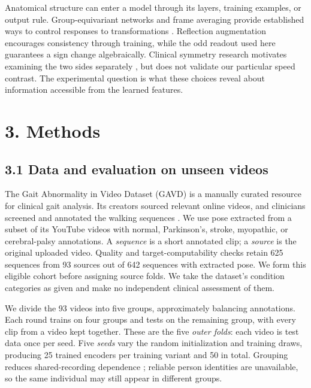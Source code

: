 \documentclass{article}
\begin{document}
Anatomical structure can enter a model through its layers, training
examples, or output rule. Group-equivariant networks and frame averaging
provide established ways to control responses to transformations
\citep{cohen2016gcnn, puny2022frame}. Reflection augmentation encourages
consistency through training, while the odd readout used here guarantees
a sign change algebraically. Clinical symmetry research motivates
examining the two sides separately \citep{patterson2010symmetry}, but
does not validate our particular speed contrast. The experimental
question is what these choices reveal about information accessible from
the learned features.

\section{3. Methods}\label{methods}

\subsection{3.1 Data and evaluation on unseen
videos}\label{data-and-evaluation-on-unseen-videos}

The Gait Abnormality in Video Dataset (GAVD) is a manually curated
resource for clinical gait analysis. Its creators sourced relevant
online videos, and clinicians screened and annotated the walking
sequences \citep{ranjan2025gavd}. We use pose extracted from a subset of
its YouTube videos with normal, Parkinson's, stroke, myopathic, or
cerebral-palsy annotations. A \emph{sequence} is a short annotated clip;
a \emph{source} is the original uploaded video. Quality and
target-computability checks retain 625 sequences from 93 sources out of
642 sequences with extracted pose. We form this eligible cohort before
assigning source folds. We take the dataset's condition categories as
given and make no independent clinical assessment of them.

We divide the 93 videos into five groups, approximately balancing
annotations. Each round trains on four groups and tests on the remaining
group, with every clip from a video kept together. These are the five
\emph{outer folds}: each video is test data once per seed. Five
\emph{seeds} vary the random initialization and training draws,
producing 25 trained encoders per training variant and 50 in total.
Grouping reduces shared-recording dependence
\citep{roberts2017crossvalidation}; reliable person identities are
unavailable, so the same individual may still appear in different
groups.
\end{document}
